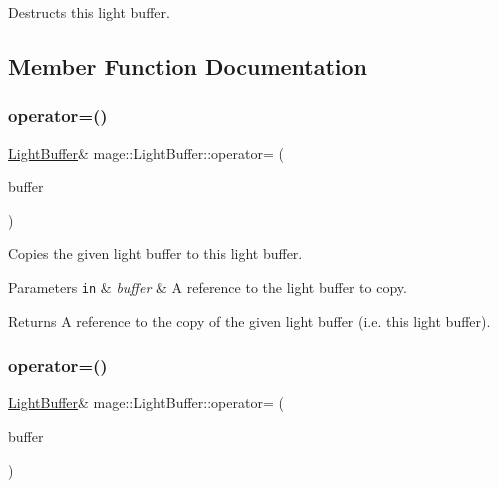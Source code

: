 Destructs this light buffer. 

\subsection{Member Function Documentation}
\hypertarget{structmage_1_1_light_buffer_ae3560a8dcda61fb02b86a370cd689e15}{}\label{structmage_1_1_light_buffer_ae3560a8dcda61fb02b86a370cd689e15} 
\subsubsection{\texorpdfstring{operator=()}{operator=()}\hspace{0.1cm}{\footnotesize\ttfamily [1/2]}}
{\footnotesize\ttfamily \hyperlink{structmage_1_1_light_buffer}{Light\+Buffer}\& mage\+::\+Light\+Buffer\+::operator= (\begin{DoxyParamCaption}\item[{const \hyperlink{structmage_1_1_light_buffer}{Light\+Buffer} \&}]{buffer }\end{DoxyParamCaption})\hspace{0.3cm}{\ttfamily [default]}}

Copies the given light buffer to this light buffer.


\begin{DoxyParams}[1]{Parameters}
\mbox{\tt in}  & {\em buffer} & A reference to the light buffer to copy. \\
\hline
\end{DoxyParams}
\begin{DoxyReturn}{Returns}
A reference to the copy of the given light buffer (i.\+e. this light buffer). 
\end{DoxyReturn}
\hypertarget{structmage_1_1_light_buffer_a7a41e25c173b24a643e6a82a382c3c35}{}\label{structmage_1_1_light_buffer_a7a41e25c173b24a643e6a82a382c3c35} 
\subsubsection{\texorpdfstring{operator=()}{operator=()}\hspace{0.1cm}{\footnotesize\ttfamily [2/2]}}
{\footnotesize\ttfamily \hyperlink{structmage_1_1_light_buffer}{Light\+Buffer}\& mage\+::\+Light\+Buffer\+::operator= (\begin{DoxyParamCaption}\item[{\hyperlink{structmage_1_1_light_buffer}{Light\+Buffer} \&\&}]{buffer }\end{DoxyParamCaption})\hspace{0.3cm}{\ttfamily [default]}}

